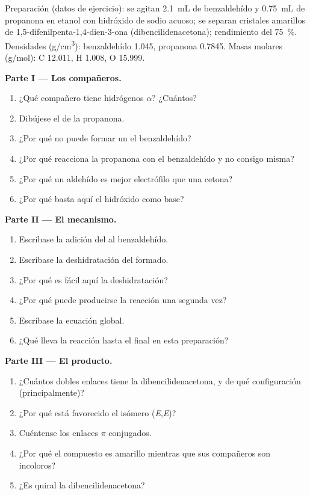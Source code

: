 \begin{problem}
\label{pb:b2:enolates-aldol:1}
Preparación (datos de ejercicio): se agitan \qty{2.1}{mL} de benzaldehído y \qty{0.75}{mL} de propanona
en etanol con hidróxido de sodio acuoso; se separan cristales amarillos de 1,5-difenilpenta-1,4-dien-3-ona
(dibencilidenacetona); rendimiento del 75~\%. Densidades (\unit{g/cm^3}): benzaldehído 1.045, propanona 0.7845.
Masas molares (\unit{g/mol}): C 12.011, H 1.008, O 15.999.

\medskip
\noindent\textbf{Parte I --- Los compañeros.}
\begin{enumerate}
  \item ¿Qué compañero tiene hidrógenos $\alpha$? ¿Cuántos?
  \item Dibújese el  de la propanona.
  \item ¿Por qué no puede formar un  el benzaldehído?
  \item ¿Por qué reacciona la propanona con el benzaldehído y no consigo misma?
  \item ¿Por qué un aldehído es mejor electrófilo que una cetona?
  \item ¿Por qué basta aquí el hidróxido como base?
\end{enumerate}

\medskip
\noindent\textbf{Parte II --- El mecanismo.}
\begin{enumerate}[resume]
  \item Escríbase la adición del  al benzaldehído.
  \item Escríbase la deshidratación del  formado.
  \item ¿Por qué es fácil aquí la deshidratación?
  \item ¿Por qué puede producirse la reacción una segunda vez?
  \item Escríbase la ecuación global.
  \item ¿Qué lleva la reacción hasta el final en esta preparación?
\end{enumerate}

\medskip
\noindent\textbf{Parte III --- El producto.}
\begin{enumerate}[resume]
  \item ¿Cuántos dobles enlaces  tiene la dibencilidenacetona, y de qué configuración (principalmente)?
  \item ¿Por qué está favorecido el isómero (\textit{E},\textit{E})?
  \item Cuéntense los enlaces $\pi$ conjugados.
  \item ¿Por qué el compuesto es amarillo mientras que sus compañeros son incoloros?
  \item ¿Es quiral la dibencilidenacetona?
\end{enumerate}


\end{problem}

